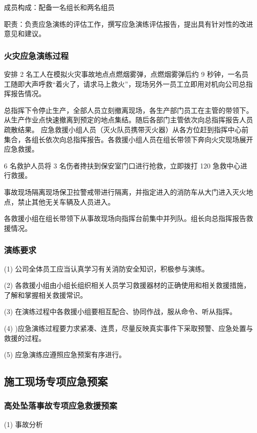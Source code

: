 成员构成：配备一名组长和两名组员

职责：负责应急演练的评估工作，撰写应急演练评估报告，提出具有针对性的改进意见和建议。

\subsubsection{火灾应急演练过程}

安排 2 名工人在模拟火灾事故地点点燃烟雾弹，点燃烟雾弹后约 9 秒钟，一名员工随即大声呼救“着火了，请求马上救火”，现场另外一员工立即用对机向公司总指挥报告情况。

总指挥下令停止生产，全部人员立刻撤离现场，各生产部门员工在主管的带领下。从生产作业点快速撤离到预定的地点集结。随后各部门主管依次向总指挥报告人员疏散结果。
应急救援小组人员（灭火队员携带灭火器）从各方位赶到指挥中心前集合，各组长依次向总指挥报告。各救援小组人员在组长带领下奔向火灾现场展开应急救援。

6 名救护人员将 3 名伤者搀扶到保安室门口进行抢救，立即拨打 120 急救中心进行救援。

事故现场隔离现场保卫拉警戒带进行隔离，并指定进入的消防车从大门进入灭火地点，禁止其他无关车辆及人员进入。

各救援小组在组长带领下从事故现场向指挥台前集中并列队。组长向总指挥报告救援情况。

\subsubsection{演练要求}

(1) 公司全体员工应当认真学习有关消防安全知识，积极参与演练。

(2) 各救援小组由小组长组织相关人员学习救援器材的正确使用和相关救援措施，了解和掌握相关救援常识。

(3) 在演练过程中各救援小组要相互配合、协同作战，服从命令、听从指挥。

(4) )应急演练过程要力求紧凑、连贯，尽量反映真实事件下采取预警、应急处置与救援的过程。

(5) 应急演练应遵照应急预案有序进行。

\subsection{施工现场专项应急预案}
\subsubsection{高处坠落事故专项应急救援预案}

(1) 事故分析\\

